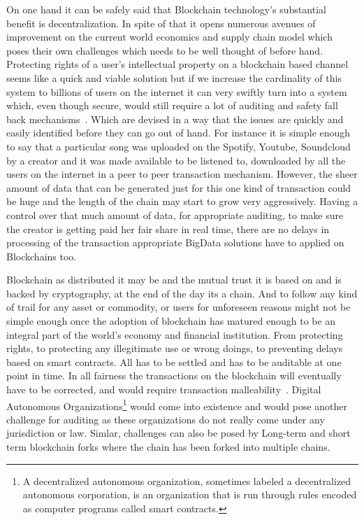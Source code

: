 On one hand it can be safely said that Blockchain technology's
substantial benefit is decentralization. In spite of that it opens
numerous avenues of improvement on the current world economics and
supply chain model which poses their own challenges which needs to be
well thought of before hand. Protecting rights of a user's
intellectual property on a blockchain based channel seems like a quick
and viable solution but if we increase the cardinality of this system
to billions of users on the internet it can very swiftly turn into a
system which, even though secure, would still require a lot of
auditing and safety fall back mechanisms~\cite{smith31}. Which are
devised in a way that the issues are quickly and easily identified
before they can go out of hand. For instance it is simple enough to
say that a particular song was uploaded on the Spotify, Youtube,
Soundcloud by a creator and it was made available to be listened to,
downloaded by all the users on the internet in a peer to peer
transaction mechanism. However, the sheer amount of data that can be
generated just for this one kind of transaction could be huge and the
length of the chain may start to grow very aggressively. Having a
control over that much amount of data, for appropriate auditing, to
make sure the creator is getting paid her fair share in real time,
there are no delays in processing of the transaction appropriate
BigData solutions have to applied on Blockchains too.

Blockchain as distributed it may be and the mutual trust it is based on
and is backed by cryptography, at the end of the day its a chain. And
to follow any kind of trail for any asset or commodity, or users for
unforeseen reasons might not be simple enough once the adoption of
blockchain has matured enough to be an integral part of the world's
economy and financial institution. From protecting rights, to
protecting any illegitimate use or wrong doings, to preventing delays
based on smart contracts. All has to be settled and has to be
auditable at one point in time. In all fairness the transactions on
the blockchain will eventually have to be corrected, and would require
transaction malleability~\cite{daniel32}. Digital Autonomous
Organizations\footnote{A decentralized autonomous organization,
  sometimes labeled a decentralized autonomous corporation, is an
  organization that is run through rules encoded as computer programs
  called smart contracts.} would come into existence and would pose
another challenge for auditing as these organizations do not really
come under any jurisdiction or law. Simlar, challenges can also be
posed by Long-term and short term blockchain forks where the chain has
been forked into multiple chains.

